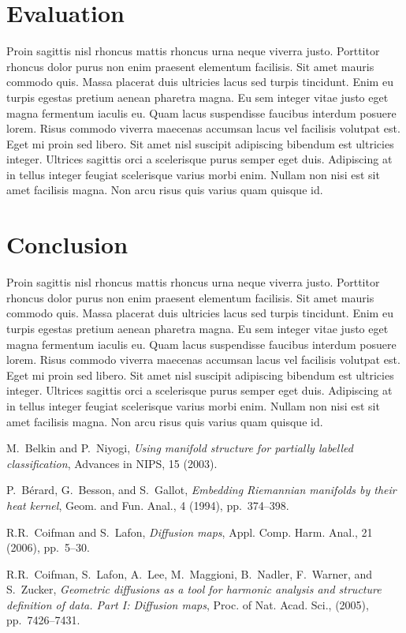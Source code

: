 \documentclass[a4paper,12pt]{article}
\begin{document}
\begin{multicols}{2}
\section{Evaluation}
Proin sagittis nisl rhoncus mattis rhoncus urna neque viverra justo. Porttitor rhoncus dolor purus non enim praesent elementum facilisis. Sit amet mauris commodo quis. Massa placerat duis ultricies lacus sed turpis tincidunt. Enim eu turpis egestas pretium aenean pharetra magna. Eu sem integer vitae justo eget magna fermentum iaculis eu. Quam lacus suspendisse faucibus interdum posuere lorem. Risus commodo viverra maecenas accumsan lacus vel facilisis volutpat est. Eget mi proin sed libero. Sit amet nisl suscipit adipiscing bibendum est ultricies integer. Ultrices sagittis orci a scelerisque purus semper eget duis. Adipiscing at in tellus integer feugiat scelerisque varius morbi enim. Nullam non nisi est sit amet facilisis magna. Non arcu risus quis varius quam quisque id.

\section{Conclusion}
Proin sagittis nisl rhoncus mattis rhoncus urna neque viverra justo. Porttitor rhoncus dolor purus non enim praesent elementum facilisis. Sit amet mauris commodo quis. Massa placerat duis ultricies lacus sed turpis tincidunt. Enim eu turpis egestas pretium aenean pharetra magna. Eu sem integer vitae justo eget magna fermentum iaculis eu. Quam lacus suspendisse faucibus interdum posuere lorem. Risus commodo viverra maecenas accumsan lacus vel facilisis volutpat est. Eget mi proin sed libero. Sit amet nisl suscipit adipiscing bibendum est ultricies integer. Ultrices sagittis orci a scelerisque purus semper eget duis. Adipiscing at in tellus integer feugiat scelerisque varius morbi enim. Nullam non nisi est sit amet facilisis magna. Non arcu risus quis varius quam quisque id.

\begin{thebibliography}{10}
M.~Belkin and P.~Niyogi, {\em Using manifold structure for partially
  labelled classification}, Advances in NIPS, 15 (2003).

P.~B\'erard, G.~Besson, and S.~Gallot, {\em Embedding {R}iemannian
  manifolds by their heat kernel}, Geom. and Fun. Anal., 4 (1994),
  pp.~374--398.

R.R.~Coifman and S.~Lafon, {\em Diffusion maps}, Appl. Comp. Harm. Anal.,
  21 (2006), pp.~5--30.

R.R.~Coifman, S.~Lafon, A.~Lee, M.~Maggioni, B.~Nadler, F.~Warner, and
  S.~Zucker, {\em Geometric diffusions as a tool for harmonic analysis and
  structure definition of data. {P}art {I}: Diffusion maps}, Proc. of Nat.
  Acad. Sci.,  (2005), pp.~7426--7431.

\end{thebibliography}

\end{multicols}
\end{document}
